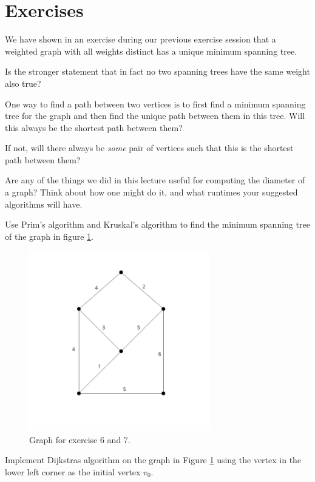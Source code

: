 \documentclass[nobib]{tufte-handout}
\begin{document}
\section{Exercises}
 
\begin{xca}
  We have shown in an exercise during our previous exercise session that a weighted graph with all weights distinct has a unique minimum spanning tree.

  Is the stronger statement that in fact no two spanning trees have the same weight also true?
\end{xca}

\begin{xca}
  One way to find a path between two vertices is to first find a minimum spanning tree for the graph and then find the unique path between them in this tree. Will this always be the shortest path between them?

  If not, will there always be \emph{some} pair of vertices such that this is the shortest path between them?
\end{xca}

\begin{xca}
  Are any of the things we did in this lecture useful for computing the diameter of a graph? Think about how one might do it, and what runtimes your suggested algorithms will have.
\end{xca}

\begin{xca}
Use Prim's algorithm and Kruskal's algorithm to find the minimum spanning tree of the graph in figure \ref{fig:new_exercise}.
\begin{figure}
    \centering
    \includegraphics[width=0.7\textwidth]{graphics/L6_prim_kruskal_dijkstra/graph_exc6-7.png}
    \caption{Graph for exercise 6 and 7.}
    \label{fig:new_exercise}
\end{figure}
\end{xca}

\begin{xca}
Implement Dijkstras algorithm on the graph in Figure \ref{fig:new_exercise} using the vertex in the lower left corner as the initial vertex $v_0$.
\end{xca}


%
%
\end{document}
